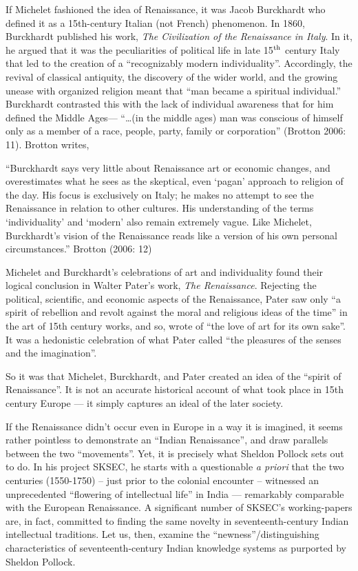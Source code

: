 If Michelet fashioned the idea of Renaissance, it was Jacob Burckhardt who defined it as a 15th-century Italian (not French) phenomenon. In 1860, Burckhardt published his work, {\sl The Civilization of the Renaissance in Italy}. In it, he argued that it was the peculiarities of political life in late 15$^{\rm th}$ century Italy that led to the creation of a “recognizably modern individuality”. Accordingly, the revival of classical antiquity, the discovery of the wider world, and the growing unease with organized religion meant that “man became a spiritual individual.” Burckhardt contrasted this with the lack of individual awareness that for him defined the Middle Ages—  “…(in the middle ages) man was conscious of himself only as a member of a race, people, party, family or corporation” (Brotton 2006: 11). Brotton writes,
\begin{myquote}
“Burckhardt says very little about Renaissance art or economic changes, and overestimates what he sees as the skeptical, even ‘pagan’ approach to religion of the day. His focus is exclusively on Italy; he makes no attempt to see the Renaissance in relation to other cultures. His understanding of the terms ‘individuality’ and ‘modern’ also remain extremely vague. Like Michelet, Burckhardt’s vision of the Renaissance reads like a version of his own personal circumstances.”  \hfill{Brotton (2006: 12)}
\end{myquote}

Michelet and Burckhardt’s celebrations of art and individuality found their logical conclusion in Walter Pater’s work, {\sl The Renaissance}. Rejecting the political, scientific, and economic aspects of the Renaissance, Pater saw only “a spirit of rebellion and revolt against the moral and religious ideas of the time” in the art of 15th century works, and so, wrote of “the love of art for its own sake”. It was a hedonistic celebration of what Pater called “the pleasures of the senses and the imagination”.  

So it was that Michelet, Burckhardt, and Pater created an idea of the “spirit of Renaissance”. It is not an accurate historical account of what took place in 15th century Europe — it simply captures an ideal of the later society. 

If the Renaissance didn’t occur even in Europe in a way it is imagined, it seems rather pointless to demonstrate an “Indian Renaissance”, and draw parallels between the two “movements”. Yet, it is precisely what Sheldon Pollock sets out to do. In his project SKSEC, he starts with a questionable {\sl a priori} that the two centuries (1550-1750) – just prior to the colonial encounter – witnessed an unprecedented “flowering of intellectual life” in India — remarkably comparable with the European Renaissance. A significant number of SKSEC’s working-papers are, in fact, committed to finding the same novelty in seventeenth-century Indian intellectual traditions. Let us, then, examine the “newness”/distinguishing characteristics of seventeenth-century Indian knowledge systems as purported by Sheldon Pollock.


